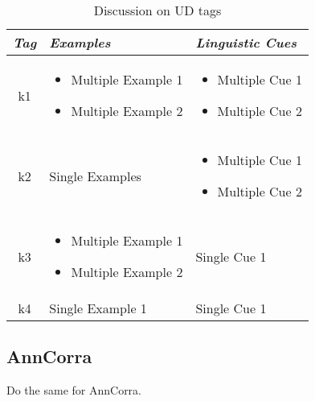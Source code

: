 \documentclass[a4 paper]{article}
\begin{document}
\begin{table}[h]
\centering
\begin{tabular}{|c|p{}|p{}|}
\hline
\textit{Tag} & \textit{Examples} & \textit{Linguistic Cues} \\ 
\hline
k1 & \begin{itemize} 
  \item Multiple Example 1
  \item Multiple Example 2
  \end{itemize}
  & \begin{itemize} 
  \item Multiple Cue 1
  \item Multiple Cue 2
  \end{itemize} \\
  \hline
k2 & Single Examples & \begin{itemize} 
  \item Multiple Cue 1
  \item Multiple Cue 2
  \end{itemize} \\
  \hline
k3 & \begin{itemize} 
  \item Multiple Example 1
  \item Multiple Example 2
  \end{itemize}
  & Single Cue 1 \\
  \hline
k4 & Single Example 1 & Single Cue 1 \\
\hline
\end{tabular}
\caption{Discussion on UD tags}
\end{table}

\subsection{AnnCorra}
Do the same for AnnCorra.
\end{document}
